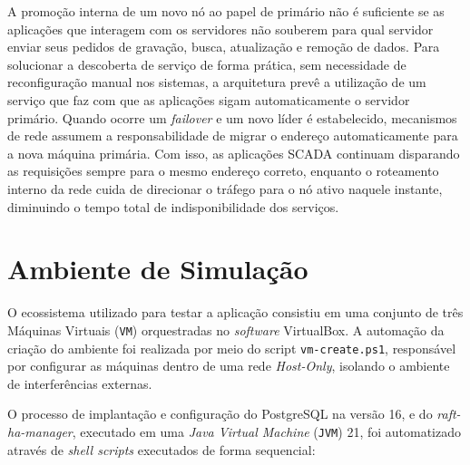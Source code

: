             A promoção interna de um novo nó ao papel de primário não é suficiente se as aplicações que interagem com os servidores não souberem para qual servidor enviar seus pedidos de gravação, busca, atualização e remoção de dados. Para solucionar a descoberta de serviço de forma prática, sem necessidade de reconfiguração manual nos sistemas, a arquitetura prevê a utilização de um serviço que faz com que as aplicações sigam automaticamente o servidor primário. Quando ocorre um \textit{failover} e um novo líder é estabelecido, mecanismos de rede assumem a responsabilidade de migrar o endereço automaticamente para a nova máquina primária. Com isso, as aplicações SCADA continuam disparando as requisições sempre para o mesmo endereço correto, enquanto o roteamento interno da rede cuida de direcionar o tráfego para o nó ativo naquele instante, diminuindo o tempo total de indisponibilidade dos serviços.
        
    \section{Ambiente de Simulação}
    
        O ecossistema utilizado para testar a aplicação consistiu em uma conjunto de três Máquinas Virtuais (\verb|VM|) orquestradas no \textit{software} VirtualBox. A automação da criação do ambiente foi realizada por meio do script \verb|vm-create.ps1|, responsável por configurar as máquinas dentro de uma rede \textit{Host-Only}, isolando o ambiente de interferências externas.
    
        O processo de implantação e configuração do PostgreSQL na versão 16, e do \textit{raft-ha-manager}, executado em uma \textit{Java Virtual Machine} (\verb|JVM|) 21, foi automatizado através de \textit{shell scripts} executados de forma sequencial:
        
